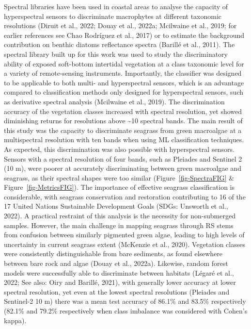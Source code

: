 \documentclass[
  letterpaper,
  11pt,
  english,
  singlespacing,
  headsepline]{MastersDoctoralThesis}
\begin{document}
\begin{spacing}{1.5}
Spectral libraries have been used in coastal areas to analyse the
capacity of hyperspectral sensors to discriminate macrophytes at
different taxonomic resolutions (Diruit et al., 2022; Douay et al.,
2022a; Mcilwaine et al., 2019; for earlier references see Chao Rodríguez
et al., 2017) or to estimate the background contribution on benthic
diatoms reflectance spectra (Barillé et al., 2011). The spectral library
built up for this work was used to study the discriminatory ability of
exposed soft-bottom intertidal vegetation at a class taxonomic level for
a variety of remote-sensing instruments. Importantly, the classifier was
designed to be applicable to both multi- and hyperspectral sensors,
which is an advantage compared to classification methods only designed
for hyperspectral sensors, such as derivative spectral analysis
(Mcilwaine et al., 2019). The discrimination accuracy of the vegetation
classes increased with spectral resolution, yet showed diminishing
returns for resolutions above \textasciitilde10 spectral bands. The main
result of this study was the capacity to discriminate seagrass from
green macroalgae at a multispectral resolution with ten bands when using
ML classification techniques. As expected, this discrimination was also
possible with hyperspectral sensors. Sensors with a spectral resolution
of four bands, such as Pleiades and Sentinel 2 (10 m), were poorer at
accurately discriminating between green macroalgae and seagrass, as
their spectral shapes were too similar (Figure~\ref{fig-SpectraFIG} \&
Figure~\ref{fig-MetricsFIG}). The importance of effective seagrass
classification is considerable, with seagrass conservation and
restoration contributing to 16 of the 17 United Nations Sustainable
Development Goals (SDGs: Unsworth et al., 2022). A practical restraint
of this analysis is the necessity for non-submerged samples. However,
the main challenge in mapping seagrass through RS stems from confusion
between similarly pigmented green algae, leading to high levels of
uncertainty in current seagrass extent (McKenzie et al., 2020).
Vegetation classes were consistently distinguishable from bare
sediments, as found elsewhere between bare rock and algae (Douay et al.,
2022a). Likewise, random forest models were successfully able to
discriminate between habitats (Légaré et al., 2022; See also: Oiry and
Barillé, 2021), with generally lower accuracy at lower spectral
resolution, yet even at the lowest spectral resolutions (Pleiades and
Sentinel-2 10 m) there was a mean test accuracy of 86.1\% and 83.5\%
respectively (82.1\% and 79.2\% respectively when class imbalance was
considered with Cohen's kappa).


\end{spacing}
\end{document}
